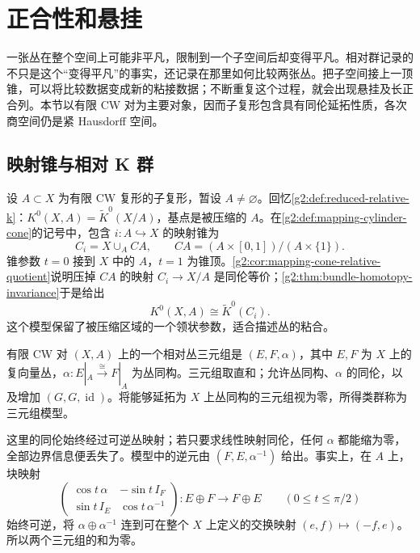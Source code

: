 
% 
% 

\section{正合性和悬挂}
\label{g2:sec:2402}

一张丛在整个空间上可能非平凡，限制到一个子空间后却变得平凡。相对群记录的不只是这个“变得平凡”的事实，还记录在那里如何比较两张丛。把子空间接上一顶锥，可以将比较数据变成新的粘接数据；不断重复这个过程，就会出现悬挂及长正合列。本节以有限 CW 对为主要对象，因而子复形包含具有同伦延拓性质，各次商空间仍是紧 Hausdorff 空间。

\subsection{映射锥与相对 K 群}
\label{g2:subsec:2402:01}
设 \(A\subset X\) 为有限 CW 复形的子复形，暂设 \(A\ne\varnothing\)。回忆\cref{g2:def:reduced-relative-k}：\(K^0(X,A)=\widetilde K^0(X/A)\)，基点是被压缩的 \(A\)。在\cref{g2:def:mapping-cylinder-cone}的记号中，包含 \(i:A\hookrightarrow X\) 的映射锥为
\[
	C_i=X\cup_A CA,\qquad CA=(A\times[0,1])/(A\times\{1\}).
\]
锥参数 \(t=0\) 接到 \(X\) 中的 \(A\)，\(t=1\) 为锥顶。\cref{g2:cor:mapping-cone-relative-quotient}说明压掉 \(CA\) 的映射 \(C_i\to X/A\) 是同伦等价；\cref{g2:thm:bundle-homotopy-invariance}于是给出
\begin{equation}\label{g2:eq:k-mapping-cone-model}
	K^0(X,A)\cong\widetilde K^0(C_i).
\end{equation}
这个模型保留了被压缩区域的一个领状参数，适合描述丛的粘合。

\begin{definition}\label{g2:def:relative-k-triple}
	有限 CW 对 \((X,A)\) 上的一个相对丛三元组是 \((E,F,\alpha)\)，其中 \(E,F\) 为 \(X\) 上的复向量丛，\(\alpha:E|_A\xrightarrow{\cong}F|_A\) 为丛同构。三元组取直和；允许丛同构、\(\alpha\) 的同伦，以及增加 \((G,G,\operatorname{id})\)。将能够延拓为 \(X\) 上丛同构的三元组视为零，所得类群称为三元组模型。
\end{definition}

这里的同伦始终经过可逆丛映射；若只要求线性映射同伦，任何 \(\alpha\) 都能缩为零，全部边界信息便丢失了。模型中的逆元由 \((F,E,\alpha^{-1})\) 给出。事实上，在 \(A\) 上，块映射
\[
	\begin{pmatrix}
		\cos t\,\alpha&-\sin t\,I_F\\
		\sin t\,I_E&\cos t\,\alpha^{-1}
	\end{pmatrix}:E\oplus F\longrightarrow F\oplus E
	\qquad(0\le t\le\pi/2)
\]
始终可逆，将 \(\alpha\oplus\alpha^{-1}\) 连到可在整个 \(X\) 上定义的交换映射 \((e,f)\mapsto(-f,e)\)。所以两个三元组的和为零。

